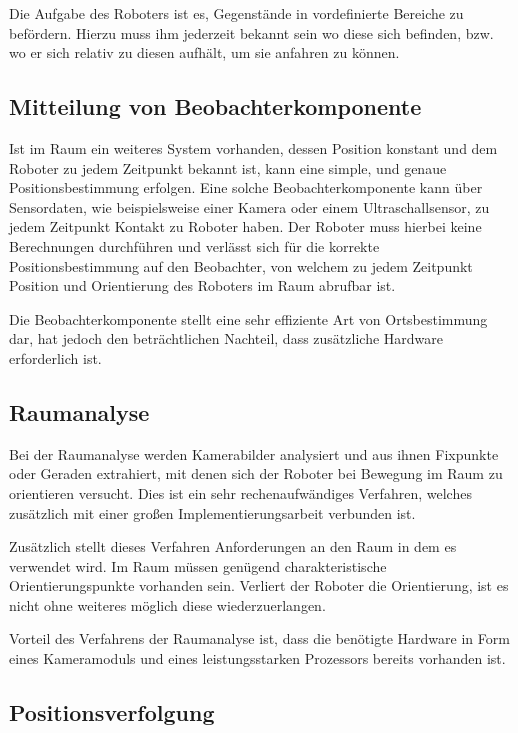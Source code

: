 Die Aufgabe des Roboters ist es, Gegenstände in vordefinierte Bereiche zu befördern. Hierzu muss ihm jederzeit bekannt sein wo diese sich befinden, bzw. wo er sich relativ zu diesen aufhält, um sie anfahren zu können.

\subsection{Mitteilung von Beobachterkomponente}

Ist im Raum ein weiteres System vorhanden, dessen Position konstant und dem Roboter zu jedem Zeitpunkt bekannt ist, kann eine simple, und genaue Positionsbestimmung erfolgen. Eine solche Beobachterkomponente kann über Sensordaten, wie beispielsweise einer Kamera oder einem Ultraschallsensor, zu jedem Zeitpunkt Kontakt zu Roboter haben.
Der Roboter muss hierbei keine Berechnungen durchführen und verlässt sich für die korrekte Positionsbestimmung auf den Beobachter, von welchem zu jedem Zeitpunkt Position und Orientierung des Roboters im Raum abrufbar ist.

Die Beobachterkomponente stellt eine sehr effiziente Art von Ortsbestimmung dar, hat jedoch den beträchtlichen Nachteil, dass zusätzliche Hardware erforderlich ist.

\subsection{Raumanalyse}

Bei der Raumanalyse werden Kamerabilder analysiert und aus ihnen Fixpunkte oder Geraden extrahiert, mit denen sich der Roboter bei Bewegung im Raum zu orientieren versucht. Dies ist ein sehr rechenaufwändiges Verfahren, welches zusätzlich mit einer großen Implementierungsarbeit verbunden ist.

Zusätzlich stellt dieses Verfahren Anforderungen an den Raum in dem es verwendet wird. Im Raum müssen genügend charakteristische Orientierungspunkte vorhanden sein. Verliert der Roboter die Orientierung, ist es nicht ohne weiteres möglich diese wiederzuerlangen.

Vorteil des Verfahrens der Raumanalyse ist, dass die benötigte Hardware in Form eines Kameramoduls und eines leistungsstarken Prozessors bereits vorhanden ist.

\subsection{Positionsverfolgung}

